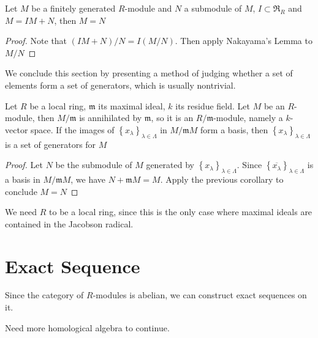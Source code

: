 \documentclass{note-eng}
\begin{document}
\begin{corollary}
    Let $M$ be a finitely generated $R$-module and $N$ a submodule of $M$, $I \subset \mathfrak{R}_R$ and $M = IM + N$, then $M = N$
\end{corollary}

\begin{proof}
    Note that $(IM + N) / N = I(M / N)$. Then apply Nakayama's Lemma to $M / N$
\end{proof}

We conclude this section by presenting a method of judging whether a set of elements form a set of generators, which is usually nontrivial.

\begin{proposition}
    Let $R$ be a local ring, $\mathfrak{m}$ its maximal ideal, $k$ its residue field. Let $M$ be an $R$-module, then $M / \mathfrak{m}$ is annihilated by $\mathfrak{m}$, so it is an $R / \mathfrak{m}$-module, namely a $k$-vector space. If the images of $\left\lbrace x_\lambda \right\rbrace_{\lambda \in \Lambda}$ in $M / \mathfrak{m}M$ form a basis, then $\left\lbrace x_{\lambda} \right\rbrace_{\lambda \in \Lambda}$ is a set of generators for $M$
\end{proposition}

\begin{proof}
    Let $N$ be the submodule of $M$ generated by $\left\lbrace x_{\lambda} \right\rbrace_{\lambda \in \Lambda}$. Since $\left\lbrace \overline{x_{\lambda}} \right\rbrace_{\lambda \in \Lambda}$ is a basis in $M / \mathfrak{m} M$, we have $N + \mathfrak{m}M = M$. Apply the previous corollary to conclude $M = N$
\end{proof}

\begin{remark}
    We need $R$ to be a local ring, since this is the only case where maximal ideals are contained in the Jacobson radical.
\end{remark}

\section{Exact Sequence}

Since the category of $R$-modules is abelian, we can construct exact sequences on it.

\TODO Need more homological algebra to continue.
\end{document}
